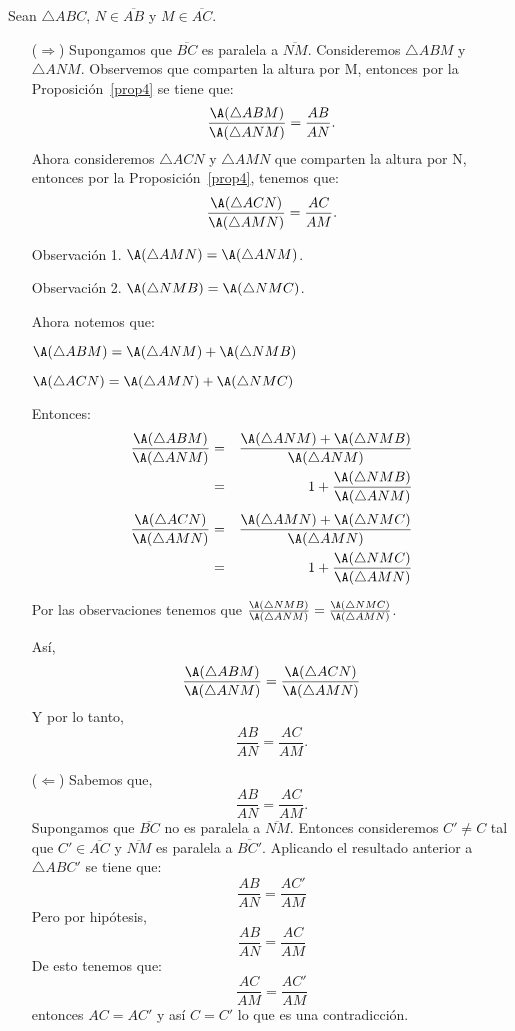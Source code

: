 \begin{dem}
Sean $\triangle ABC$, $N\in\overline{AB}$  y $M\in\overline{AC}$.
\begin{enumerate}
\item[($\Rightarrow$)]
Supongamos que $\overline{BC}$ es paralela a $\overline{NM}$. Consideremos $\triangle ABM$ y $\triangle ANM$. Observemos que comparten la altura por M, entonces por la Proposición~\ref{prop4} se tiene que: $$\frac{\A(\triangle ABM)}{\A(\triangle ANM)}=\frac{AB}{AN}.$$ 
Ahora consideremos $\triangle ACN$ y $\triangle AMN$ que comparten la altura por N, entonces por la Proposición~\ref{prop4}, tenemos que: $$\frac{\A(\triangle ACN)}{\A(\triangle AMN)}=\frac{AC}{AM}.$$ 

Observación 1. $\A(\triangle AMN)=\A(\triangle ANM)$.

Observación 2. $\A(\triangle NMB)=\A(\triangle NMC)$.

Ahora notemos que:

$\A(\triangle ABM)=\A(\triangle ANM)+\A(\triangle NMB)$

$\A(\triangle ACN)=\A(\triangle AMN)+\A(\triangle NMC)$

Entonces:
\begin{eqnarray*}
\frac{\A(\triangle ABM)}{\A(\triangle ANM)}
&=& \frac{\A(\triangle ANM)+\A(\triangle NMB)}{\A(\triangle ANM)}\\
&=& 1+\frac{\A(\triangle NMB)}{\A(\triangle ANM)}\\
\end{eqnarray*}
\begin{eqnarray*}
\frac{\A(\triangle ACN)}{\A(\triangle AMN)}
&=& \frac{\A(\triangle AMN)+\A(\triangle NMC)}{\A(\triangle AMN)}\\
&=& 1+\frac{\A(\triangle NMC)}{\A(\triangle AMN)}\\
\end{eqnarray*}

Por las observaciones tenemos que $\frac{\A(\triangle NMB)}{\A(\triangle ANM)}=\frac{\A(\triangle NMC)}{\A(\triangle AMN)}$.

Así, $$\frac{\A(\triangle ABM)}{\A(\triangle ANM)}=\frac{\A(\triangle ACN)}{\A(\triangle AMN)}
$$
Y por lo tanto,  $$\frac{AB}{AN}=\frac{AC}{AM}.$$
\item[($\Leftarrow$)] 
Sabemos que, $$\frac{AB}{AN}=\frac{AC}{AM}.$$ Supongamos que $\overline{BC}$ no es paralela a          
$\overline{NM}$. Entonces consideremos $C'\neq C$ tal que $C'\in\overline{AC}$ y  $\overline{NM}$ es paralela a          
$\overline{BC'}$.
Aplicando el resultado anterior a $\triangle ABC'$ se tiene que:
\begin{equation}
\frac{AB}{AN}=\frac{AC'}{AM}
\end{equation}	 
Pero por hipótesis, 
\begin{equation}
\frac{AB}{AN}=\frac{AC}{AM}
\end{equation}
De esto tenemos que: 
$$\frac{AC}{AM}=\frac{AC'}{AM}$$ entonces $AC=AC'$ y así $C=C'$ lo que es una contradicción. 
\end{enumerate}
\end{dem}
	
